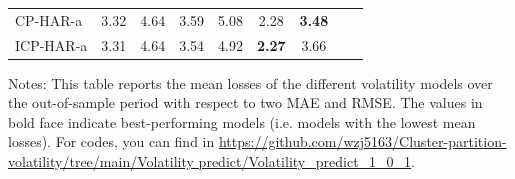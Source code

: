 \documentclass[preprint,12pt,authoryear]{elsarticle}
\begin{document}
\begin{center}
\begin{threeparttable}
\begin{tabular}{l c c c c c c c c}
CP-HAR-a     & 3.32          &  4.64         & 3.59          & 5.08          & 2.28         & \textbf{3.48} \\
ICP-HAR-a    & 3.31          &  4.64         & 3.54          & 4.92          & \textbf{2.27} & 3.66 \\
\bottomrule
\end{tabular}
Notes: This table reports the mean losses of the different volatility models over the out-of-sample period with respect to two MAE and RMSE. The values in bold face indicate best-performing models (i.e. models with the lowest mean losses). For codes, you can find in
\url{https://github.com/wzj5163/Cluster-partition-volatility/tree/main/Volatility predict/Volatility_predict_1_0_1}.
\end{threeparttable}
\end{center}
\end{document}
